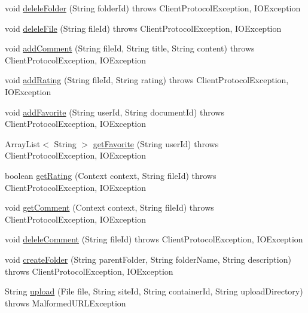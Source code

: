 \begin{DoxyCompactItemize}
\item 
void \hyperlink{classcom_1_1zia_1_1freshdocs_1_1cmis_1_1_c_m_i_s_aa06b6578158202d5723ba4062b6ae971}{delele\-Folder} (String folder\-Id)  throws Client\-Protocol\-Exception, I\-O\-Exception
\item 
void \hyperlink{classcom_1_1zia_1_1freshdocs_1_1cmis_1_1_c_m_i_s_adac18594a575684caab02e98bae07409}{delele\-File} (String file\-Id)  throws Client\-Protocol\-Exception, I\-O\-Exception
\item 
void \hyperlink{classcom_1_1zia_1_1freshdocs_1_1cmis_1_1_c_m_i_s_a9744e94654165b00da1a1f00347506a1}{add\-Comment} (String file\-Id, String title, String content)  throws Client\-Protocol\-Exception, I\-O\-Exception
\item 
void \hyperlink{classcom_1_1zia_1_1freshdocs_1_1cmis_1_1_c_m_i_s_a12bcedc94df1b7921bacc20e411d928d}{add\-Rating} (String file\-Id, String rating)  throws Client\-Protocol\-Exception, I\-O\-Exception
\item 
void \hyperlink{classcom_1_1zia_1_1freshdocs_1_1cmis_1_1_c_m_i_s_ac513a06ccb3997e6cd74b61cc8ea8567}{add\-Favorite} (String user\-Id, String document\-Id)  throws Client\-Protocol\-Exception, I\-O\-Exception
\item 
Array\-List$<$ String $>$ \hyperlink{classcom_1_1zia_1_1freshdocs_1_1cmis_1_1_c_m_i_s_a61b23d32d04ae23e5280b9b32dfc6021}{get\-Favorite} (String user\-Id)  throws Client\-Protocol\-Exception, I\-O\-Exception
\item 
boolean \hyperlink{classcom_1_1zia_1_1freshdocs_1_1cmis_1_1_c_m_i_s_a0fc9fa76f66ae785cd9decdb234435d4}{get\-Rating} (Context context, String file\-Id)  throws Client\-Protocol\-Exception, I\-O\-Exception 
\item 
void \hyperlink{classcom_1_1zia_1_1freshdocs_1_1cmis_1_1_c_m_i_s_a982adbeeea774e46032b4f5f935eef86}{get\-Comment} (Context context, String file\-Id)  throws Client\-Protocol\-Exception, I\-O\-Exception
\item 
void \hyperlink{classcom_1_1zia_1_1freshdocs_1_1cmis_1_1_c_m_i_s_ab605a374bfac712459a935781e48ddd5}{delele\-Comment} (String file\-Id)  throws Client\-Protocol\-Exception, I\-O\-Exception
\item 
void \hyperlink{classcom_1_1zia_1_1freshdocs_1_1cmis_1_1_c_m_i_s_a97b10304ec4cfd60ee8034f2016257e3}{create\-Folder} (String parent\-Folder, String folder\-Name, String description)  throws Client\-Protocol\-Exception, I\-O\-Exception 
\item 
String \hyperlink{classcom_1_1zia_1_1freshdocs_1_1cmis_1_1_c_m_i_s_a1f81d462d8556e4359077ebe666a1b22}{upload} (File file, String site\-Id, String container\-Id, String upload\-Directory)  throws Malformed\-U\-R\-L\-Exception 

\end{DoxyCompactItemize}
